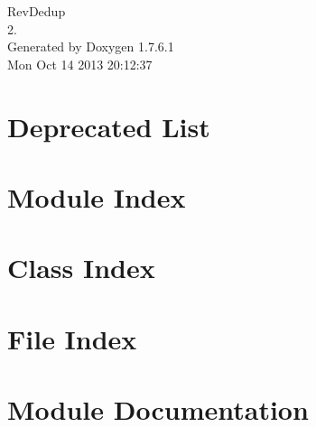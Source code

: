 \documentclass[a4paper]{book}
\begin{document}
\hypersetup{pageanchor=false,citecolor=blue}
\begin{titlepage}
\vspace*{7cm}
\begin{center}
{\Large \-Rev\-Dedup \\[1ex]\large 2. }\\
\vspace*{1cm}
{\large \-Generated by Doxygen 1.7.6.1}\\
\vspace*{0.5cm}
{\small Mon Oct 14 2013 20:12:37}\\
\end{center}
\end{titlepage}
\clearemptydoublepage
{}
\tableofcontents
\clearemptydoublepage
{}
\hypersetup{pageanchor=true,citecolor=blue}
\chapter{\-Deprecated \-List}
\label{deprecated}
\hypertarget{deprecated}{}

\chapter{\-Module \-Index}

\chapter{\-Class \-Index}

\chapter{\-File \-Index}

\chapter{\-Module \-Documentation}











\end{document}
